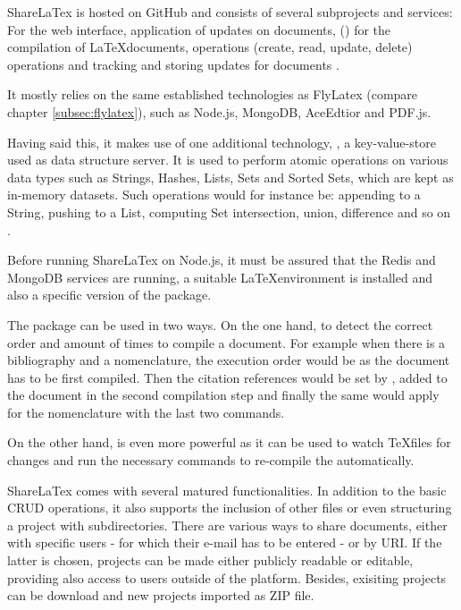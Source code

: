 ShareLaTex is hosted on GitHub and consists of several subprojects and services: For the web interface, application of updates on documents,  () for the compilation of \LaTeX documents,  operations (create, read, update, delete) operations and tracking and storing updates for documents \cite{website:sharelatex-github}.

It mostly relies on the same established technologies as FlyLatex (compare chapter \ref{subsec:flylatex}), such as Node.js, MongoDB, AceEdtior and PDF.js. 

Having said this, it makes use of one additional technology, , a key-value-store used as data structure server. It is used to perform atomic operations on various data types such as Strings, Hashes, Lists, Sets and Sorted Sets, which are kept as in-memory datasets. Such operations would for instance be: appending to a String, pushing to a List, computing Set intersection, union, difference and so on \cite{website:redis}.

Before running ShareLaTex on Node.js, it must be assured that the Redis and MongoDB services are running, a suitable \LaTeX environment is installed and also a specific version of the  package.

The  package can be used in two ways. On the one hand, to detect the correct order and amount of times to compile a document. For example when there is a bibliography and a nomenclature, the execution order would be  as the document has to be first compiled. Then the citation references would be set by , added to the document in the second compilation step and finally the same would apply for the nomenclature with the last two commands.

On the other hand,  is even more powerful as it can be used to watch \TeX files for changes and run the necessary commands to re-compile the  automatically.

ShareLaTex comes with several matured functionalities. In addition to the basic CRUD operations, it also supports the inclusion of other files or  even structuring a project with subdirectories. There are various ways to share documents, either with specific users - for which their e-mail has to be entered - or by URI. If the latter is chosen, projects can be made either publicly readable or editable, providing also access to users outside of the platform. Besides, exisiting projects can be download and new projects imported as ZIP file.

